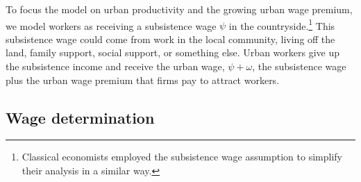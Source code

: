 To focus the model on urban productivity and the growing urban wage premium, we model workers as receiving a \gls{subsistence wage} $\psi$ in the countryside.\footnote{Classical economists employed the \gls{subsistence wage} assumption to simplify their analysis in a similar way.} %
%
This subsistence wage could come from work in the local community, living off the land, family support, social support, or something else. 
Urban workers give up the subsistence income and receive the \gls{urban wage}, $\psi +  \omega$, the subsistence wage plus the \gls{urban wage premium} that firms pay to attract workers. 

\subsection{Wage determination}

